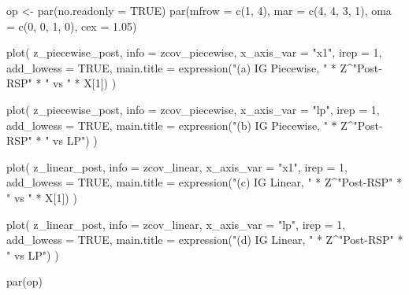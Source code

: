 \documentclass[
  english,
  letterpaper,
  DIV=11,
  numbers=noendperiod]{scrartcl}
\newenvironment{Shaded}{\begin{snugshade}}{\end{snugshade}}
\newcommand{\AttributeTok}[1]{\textcolor[rgb]{0.40,0.45,0.13}{#1}}
\newcommand{\ConstantTok}[1]{\textcolor[rgb]{0.56,0.35,0.01}{#1}}
\newcommand{\DecValTok}[1]{\textcolor[rgb]{0.68,0.00,0.00}{#1}}
\newcommand{\FloatTok}[1]{\textcolor[rgb]{0.68,0.00,0.00}{#1}}
\newcommand{\FunctionTok}[1]{\textcolor[rgb]{0.28,0.35,0.67}{#1}}
\newcommand{\NormalTok}[1]{\textcolor[rgb]{0.00,0.23,0.31}{#1}}
\newcommand{\OtherTok}[1]{\textcolor[rgb]{0.00,0.23,0.31}{#1}}
\newcommand{\SpecialCharTok}[1]{\textcolor[rgb]{0.37,0.37,0.37}{#1}}
\newcommand{\StringTok}[1]{\textcolor[rgb]{0.13,0.47,0.30}{#1}}
\begin{document}
\begin{Shaded}
\begin{Highlighting}[]
\NormalTok{op }\OtherTok{\textless{}{-}} \FunctionTok{par}\NormalTok{(}\AttributeTok{no.readonly =} \ConstantTok{TRUE}\NormalTok{)}
\FunctionTok{par}\NormalTok{(}\AttributeTok{mfrow =} \FunctionTok{c}\NormalTok{(}\DecValTok{1}\NormalTok{, }\DecValTok{4}\NormalTok{), }\AttributeTok{mar =} \FunctionTok{c}\NormalTok{(}\DecValTok{4}\NormalTok{, }\DecValTok{4}\NormalTok{, }\DecValTok{3}\NormalTok{, }\DecValTok{1}\NormalTok{), }\AttributeTok{oma =} \FunctionTok{c}\NormalTok{(}\DecValTok{0}\NormalTok{, }\DecValTok{0}\NormalTok{, }\DecValTok{1}\NormalTok{, }\DecValTok{0}\NormalTok{), }\AttributeTok{cex =} \FloatTok{1.05}\NormalTok{)}

\FunctionTok{plot}\NormalTok{(}
\NormalTok{  z\_piecewise\_post,}
  \AttributeTok{info =}\NormalTok{ zcov\_piecewise,}
  \AttributeTok{x\_axis\_var =} \StringTok{"x1"}\NormalTok{,}
  \AttributeTok{irep =} \DecValTok{1}\NormalTok{,}
  \AttributeTok{add\_lowess =} \ConstantTok{TRUE}\NormalTok{,}
  \AttributeTok{main.title =} \FunctionTok{expression}\NormalTok{(}\StringTok{"(a) IG Piecewise, "} \SpecialCharTok{*}\NormalTok{ Z}\SpecialCharTok{\^{}}\StringTok{"Post{-}RSP"} \SpecialCharTok{*} \StringTok{" vs "} \SpecialCharTok{*}\NormalTok{ X[}\DecValTok{1}\NormalTok{])}
\NormalTok{)}

\FunctionTok{plot}\NormalTok{(}
\NormalTok{  z\_piecewise\_post,}
  \AttributeTok{info =}\NormalTok{ zcov\_piecewise,}
  \AttributeTok{x\_axis\_var =} \StringTok{"lp"}\NormalTok{,}
  \AttributeTok{irep =} \DecValTok{1}\NormalTok{,}
  \AttributeTok{add\_lowess =} \ConstantTok{TRUE}\NormalTok{,}
  \AttributeTok{main.title =} \FunctionTok{expression}\NormalTok{(}\StringTok{"(b) IG Piecewise, "} \SpecialCharTok{*}\NormalTok{ Z}\SpecialCharTok{\^{}}\StringTok{"Post{-}RSP"} \SpecialCharTok{*} \StringTok{" vs LP"}\NormalTok{)}
\NormalTok{)}

\FunctionTok{plot}\NormalTok{(}
\NormalTok{  z\_linear\_post,}
  \AttributeTok{info =}\NormalTok{ zcov\_linear,}
  \AttributeTok{x\_axis\_var =} \StringTok{"x1"}\NormalTok{,}
  \AttributeTok{irep =} \DecValTok{1}\NormalTok{,}
  \AttributeTok{add\_lowess =} \ConstantTok{TRUE}\NormalTok{,}
  \AttributeTok{main.title =} \FunctionTok{expression}\NormalTok{(}\StringTok{"(c) IG Linear, "} \SpecialCharTok{*}\NormalTok{ Z}\SpecialCharTok{\^{}}\StringTok{"Post{-}RSP"} \SpecialCharTok{*} \StringTok{" vs "} \SpecialCharTok{*}\NormalTok{ X[}\DecValTok{1}\NormalTok{])}
\NormalTok{)}

\FunctionTok{plot}\NormalTok{(}
\NormalTok{  z\_linear\_post,}
  \AttributeTok{info =}\NormalTok{ zcov\_linear,}
  \AttributeTok{x\_axis\_var =} \StringTok{"lp"}\NormalTok{,}
  \AttributeTok{irep =} \DecValTok{1}\NormalTok{,}
  \AttributeTok{add\_lowess =} \ConstantTok{TRUE}\NormalTok{,}
  \AttributeTok{main.title =} \FunctionTok{expression}\NormalTok{(}\StringTok{"(d) IG Linear, "} \SpecialCharTok{*}\NormalTok{ Z}\SpecialCharTok{\^{}}\StringTok{"Post{-}RSP"} \SpecialCharTok{*} \StringTok{" vs LP"}\NormalTok{)}
\NormalTok{)}

\FunctionTok{par}\NormalTok{(op)}
\end{Highlighting}
\end{Shaded}
\end{document}
